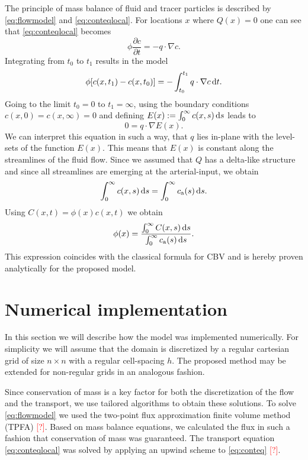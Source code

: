 \documentclass[paper=a4, fontsize=12pt,parskip=half, draft, headings=small]{scrartcl}
\newcommand{\ca}{c_\mathrm{a}}
\newcommand{\missingsource}{\textcolor{red}{[?]}}
\begin{document}
	The principle of mass balance of fluid and tracer particles is described by \eqref{eq:flowmodel} and \eqref{eq:conteqlocal}. 
	For locations $x$ where $Q(x) = 0$ one can see that \eqref{eq:conteqlocal} becomes
	\[
		\phi\frac{\partial c}{\partial t}  = - q \cdot \nabla c.
		\label{eq:1cmodel}
	\]
	Integrating from $t_0$ to $t_1$ results in the model
	\[
		\phi [c(x,t_1) - c(x,t_0)]  = - \int_{t_0}^{t_1}q \cdot  \nabla c \,\mathrm{d} t.
	\]
	Going to the limit $t_0 = 0$ to $t_1 = \infty$, using the boundary conditions $c(x,0) = c(x,\infty) = 0$ and defining $E(x):= \int_0^\infty c(x,s) \,\mathrm{d} s$ leads to
	\[
		0 = q \cdot \nabla  E(x).
		\label{eq:streamlinezero}
	\]
	We can interpret this equation in such a way, that $q$ lies in-plane with the level-sets of the function $E(x)$.
	This means that $E(x)$ is constant along the streamlines of the fluid flow.
	Since we assumed that $Q$ has a delta-like structure and since all streamlines are emerging at the arterial-input, we obtain
	\[
		\int_0^\infty c(x,s) \diffint s = \int_0^\infty \ca(s) \diffint s.
	\]
	Using $C(x,t) = \phi(x) c(x,t)$ we obtain
	\begin{equation}
		\phi(x) =  \frac{ \int_{0}^{\infty} C(x,s) \diffint s }{ \int_{0}^{\infty} \ca(s) \diffint s}.
		\label{eq:phi}
	\end{equation}
	This expression coincides with the classical formula for CBV and is hereby proven analytically for the proposed model.
	
	

	
	\section{Numerical implementation}
	
	In this section we will describe how the model was implemented numerically.
	For simplicity we will assume that the domain is discretized by a regular cartesian grid of size $n \times n$ with a regular cell-spacing $h$.
	The proposed method may be extended for non-regular grids in an analogous fashion.
	
	Since conservation of mass is a key factor for both the discretization of the flow and the transport, we use tailored algorithms to obtain these solutions.
	To solve \eqref{eq:flowmodel} we used the two-point flux approximation finite volume method (TPFA) \missingsource. 
	Based on mass balance equations, we calculated the flux in such a fashion that conservation of mass was guaranteed.
	The transport equation \eqref{eq:conteqlocal} was solved by applying an upwind scheme to \eqref{eq:conteq} \missingsource.
\end{document}
